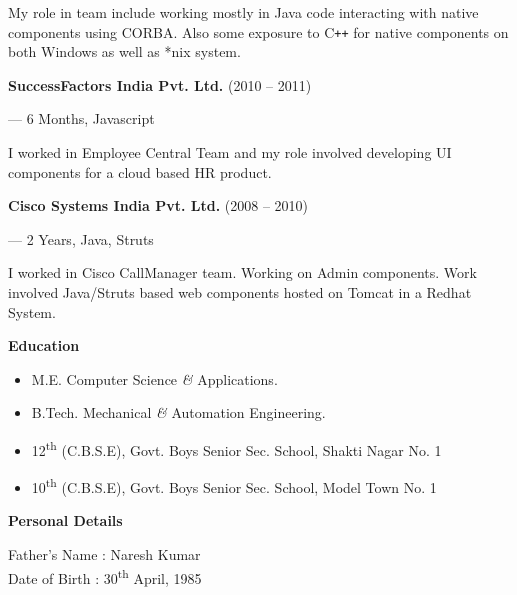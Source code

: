 \documentclass{article}
\begin{document}
   My role in team include working mostly in Java code interacting with native components using CORBA. Also some exposure to C{}\verb!++! for native components on both Windows as well as *nix system.
\begin{center}
   {\bf SuccessFactors India Pvt. Ltd.} (2010 -- 2011)\\ 
\end{center}
\begin{flushright}--- 6 Months, Javascript\end{flushright}
   I worked in Employee Central Team and my role involved developing UI components for a cloud based HR product.
\begin{center}
   {\bf Cisco Systems India Pvt. Ltd.} (2008 -- 2010)\\
\end{center}
\begin{flushright} --- 2 Years, Java, Struts \end{flushright}
   I worked in Cisco CallManager team. Working on Admin components. Work involved Java/Struts based web components hosted on Tomcat in a Redhat System.
\begin{flushleft}
\large\bf{Education}
\end{flushleft}
\begin{itemize}
\item M.E. Computer Science {\it\&} Applications.
\item  B.Tech. Mechanical {\it\&} Automation Engineering.
\item  12\textsuperscript{th} (C.B.S.E), Govt. Boys Senior Sec. School, Shakti Nagar No. 1 
\item  10\textsuperscript{th} (C.B.S.E), Govt. Boys Senior Sec. School, Model Town No. 1 
\end{itemize}
\begin{flushleft}
{\bf Personal Details}
\end{flushleft}
Father's Name : Naresh Kumar\\
Date of Birth : 30\textsuperscript{th} April, 1985
\vfill
\hrulefill
\end{document}
